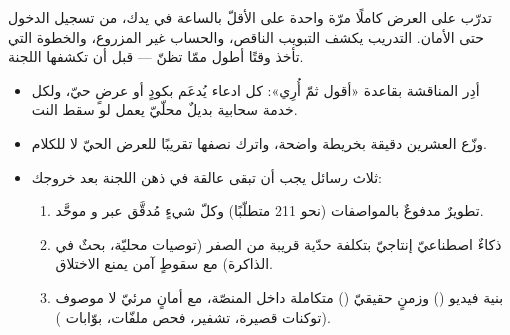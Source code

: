 \begin{note}
تدرّب على العرض كاملًا مرّة واحدة على الأقلّ بالساعة في يدك، من تسجيل الدخول حتى
الأمان. التدريب يكشف التبويب الناقص، والحساب غير المزروع، والخطوة التي تأخذ وقتًا
أطول ممّا تظنّ — قبل أن تكشفها اللجنة.
\end{note}

\begin{summary}
\begin{itemize}
\item أدِر المناقشة بقاعدة «أقول ثمّ أُرِي»: كل ادعاء يُدعَم بكودٍ أو عرضٍ حيّ، ولكل
  خدمة سحابية بديلٌ محلّيّ يعمل  لو سقط النت.
\item وزّع العشرين دقيقة بخريطة واضحة، واترك نصفها تقريبًا للعرض الحيّ لا للكلام.
\item ثلاث رسائل يجب أن تبقى عالقة في ذهن اللجنة بعد خروجك:
  \begin{enumerate}
    \item تطويرٌ مدفوعٌ بالمواصفات (نحو 211 متطلّبًا) وكلّ شيءٍ مُدقَّق عبر
       و موحَّد.
    \item ذكاءٌ اصطناعيّ إنتاجيّ بتكلفة حدّية قريبة من الصفر (توصيات محليّة، بحثٌ في
      الذاكرة) مع سقوطٍ آمن يمنع الاختلاق.
    \item بنية فيديو () وزمنٍ حقيقيّ () متكاملة داخل المنصّة، مع
      أمانٍ مرئيّ لا موصوف (توكنات قصيرة، تشفير، فحص ملفّات، بوّابات ).
  \end{enumerate}
\end{itemize}
\end{summary}
